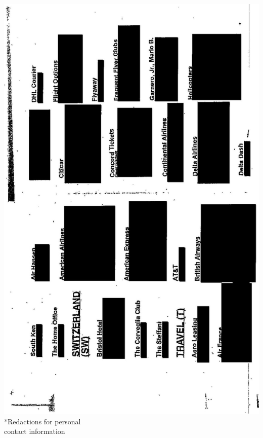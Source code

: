 \documentclass[10pt]{article}
\begin{document}
\includegraphics[max width=\textwidth, center]{2025_02_27_dd68c3d38de88f0516d9g-210}\\
*Redactions for personal\\
contact information\\
\end{document}
